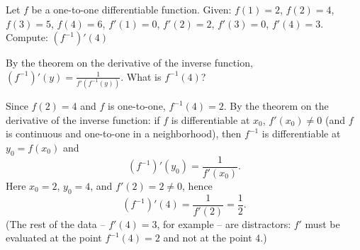 
\begin{question}
Let $f$ be a one-to-one differentiable function. Given: $f(1)=2$, $f(2)=4$, $f(3)=5$, $f(4)=6$, $f'(1)=0$, $f'(2)=2$, $f'(3)=0$, $f'(4)=3$.
Compute: $\left(f^{-1}\right)'(4)$
\end{question}

\begin{hint}
By the theorem on the derivative of the inverse function, $(f^{-1})'(y)=\frac{1}{f'(f^{-1}(y))}$. What is $f^{-1}(4)$?
\end{hint}

\begin{solution}
Since $f(2)=4$ and $f$ is one-to-one, $f^{-1}(4)=2$.
By the theorem on the derivative of the inverse function: if $f$ is differentiable at $x_0$, $f'(x_0)\ne0$ (and $f$ is continuous and one-to-one in a neighborhood), then $f^{-1}$ is differentiable at $y_0=f(x_0)$ and
\[ (f^{-1})'(y_0)=\frac{1}{f'(x_0)}. \]
Here $x_0=2$, $y_0=4$, and $f'(2)=2\ne0$, hence
\[ \boxed{(f^{-1})'(4)=\frac{1}{f'(2)}=\frac12}. \]
(The rest of the data -- $f'(4)=3$, for example -- are distractors: $f'$ must be evaluated at the point $f^{-1}(4)=2$ and not at the point $4$.)
\end{solution}
